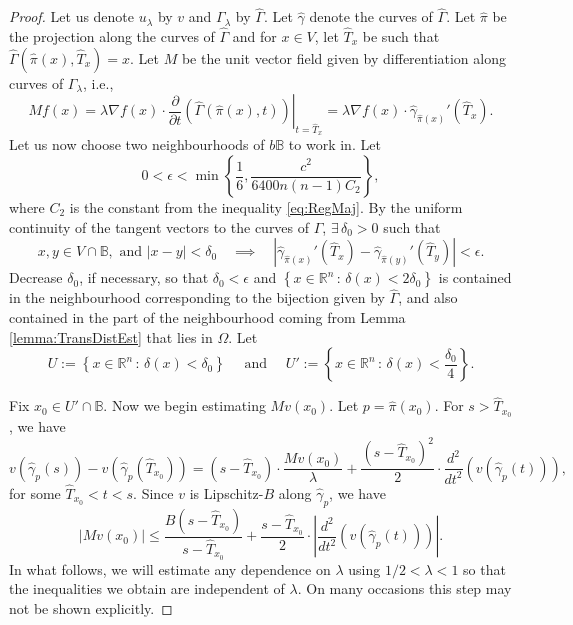 \documentclass[12pt,a4paper]{amsart}
\numberwithin{equation}{section}
\theoremstyle{definition}
\begin{document}
\begin{proof}
Let us denote $u_\lambda$ by $v$ and $\Gamma_\lambda$ by $\widehat{\Gamma}$. Let $\widehat{\gamma}$ denote the curves of $\widehat{\Gamma}$. Let $\widehat{\pi}$ be the projection along the curves of $\widehat{\Gamma}$ and for $x\in V$, let $\widehat{T}_x$ be such 
that $\widehat{\Gamma}\left(\widehat{\pi}(x), \widehat{T}_x\right) = x$. Let $M$ be the unit vector field given by differentiation along curves of $\Gamma_\lambda$, i.e.,
\[Mf(x) = \lambda\nabla f(x) \cdot \left.\frac{\partial}{\partial t}\left(\widehat{\Gamma}\left(\widehat{\pi}(x),t\right)\right)\right|_{t=\widehat{T}_x} = \lambda\nabla f(x) \cdot \widehat{\gamma}_{\widehat{\pi}(x)}'(\widehat{T}_x).\]
Let us now choose two neighbourhoods of $b\mathbb{B}$ to work in. Let 
\[0 < \epsilon < \min\left\{\frac{1}{6},  \frac{c^2}{6400n(n-1)C_2}\right\},\]
where $C_2$ is the constant from the inequality \eqref{eq:RegMaj}. By the uniform continuity of the tangent vectors to the curves of $\Gamma$, $\exists\, \delta_0 > 0$ such that
\[x,y\in V\cap\mathbb{B}, \text{ and }{\left\lvert{x-y}\right\rvert} < \delta_0 \quad\implies\quad {\left\lvert{\widehat{\gamma}_{\widehat{\pi}(x)}'(\widehat{T}_x) - \widehat{\gamma}_{\widehat{\pi}(y)}'(\widehat{T}_{y})}\right\rvert} < \epsilon.\]
Decrease $\delta_0$, if necessary, so that $\delta_0 < \epsilon$ and 
$\left\{x\in\mathbb{R}^n \, :\, \delta(x) < 2\delta_0\right\}$ is contained in the neighbourhood corresponding to the bijection given by $\widehat{\Gamma}$, and also contained in the part of the neighbourhood coming from Lemma 
\ref{lemma:TransDistEst} that lies in $\Omega$. Let 
\[U := \left\{ x\in\mathbb{R}^n \, :\, \delta(x) < \delta_0\right\}\quad\text{ and }\quad U' := \left\{ x\in\mathbb{R}^n \, :\, \delta(x) < \frac{\delta_0}{4}\right\}.\]

Fix $x_0\in U'\cap\mathbb{B}$. Now we begin estimating $Mv(x_0)$. Let $p=\widehat{\pi}(x_0)$. For $s>\widehat{T}_{x_0}$, we have
\[v\left(\widehat{\gamma}_{p}(s)\right) - v\left(\widehat{\gamma}_{p}(\widehat{T}_{x_0})\right) = (s-\widehat{T}_{x_0})\cdot \frac{Mv(x_0)}{\lambda} + \frac{(s-\widehat{T}_{x_0})^2}{2}\cdot\frac{d^2}{dt^2}\left(v\left(\widehat{\gamma}_p(t)\right)\right),\]
for some $\widehat{T}_{x_0} < t < s$. Since $v$ is Lipschitz-$B$ along $\widehat{\gamma}_p$, we have
\begin{equation}\label{eq:Dagger}
{\left\lvert{Mv(x_0)}\right\rvert} \le \frac{B(s-\widehat{T}_{x_0})}{s-\widehat{T}_{x_0}} + \frac{s-\widehat{T}_{x_0}}{2}\cdot{\left\lvert{\frac{d^2}{dt^2}\left(v\left(\widehat{\gamma}_p(t)\right)\right)}\right\rvert}.
\end{equation}
In what follows, we will estimate any dependence on $\lambda$ using $1/2 < \lambda < 1$ so that the inequalities we obtain are independent of $\lambda$. On many occasions this step may not be shown 
explicitly. 


\end{proof}
\end{document}
